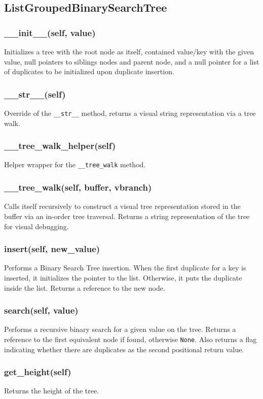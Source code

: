 \documentclass[fleqn,10pt]{SelfArx} %
\begin{document}
\subsection*{ListGroupedBinarySearchTree}
\subsubsection*{\_\_init\_\_(self, value)}
Initializes a tree with the root node as itself, contained value/key with the given value, null pointers to siblings nodes and parent node, and a null pointer for a list of duplicates to be initialized upon duplicate insertion.
\subsubsection*{\_\_str\_\_(self)}
Override of the \texttt{\_\_str\_\_} method, returns a visual string representation via a tree walk.
\subsubsection*{\_\_tree\_walk\_helper(self)}
Helper wrapper for the \texttt{\_\_tree\_walk} method.
\subsubsection*{\_\_tree\_walk(self, buffer, vbranch)}
Calls itself recursively to construct a visual tree representation stored in the buffer via an in-order tree traversal. Returns a string representation of the tree for visual debugging.
\subsubsection*{insert(self, new\_value)}
Performs a Binary Search Tree insertion. When the first duplicate for a key is inserted, it initializes the pointer to the list. Otherwise, it puts the duplicate inside the list. Returns a reference to the new node.
\subsubsection*{search(self, value)}
Performs a recursive binary search for a given value on the tree. Returns a reference to the first equivalent node if found, otherwise \texttt{None}. Also returns a flag indicating whether there are duplicates as the second positional return value.
\subsubsection*{get\_height(self)}
Returns the height of the tree.
\end{document}
